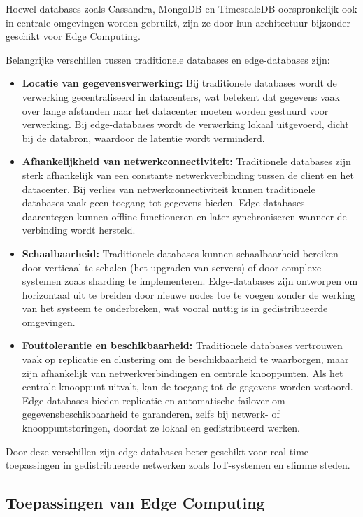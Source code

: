 Hoewel databases zoals Cassandra, MongoDB en TimescaleDB oorspronkelijk ook in centrale omgevingen worden gebruikt, zijn ze door hun architectuur bijzonder geschikt voor Edge Computing\autocite{Rahmani2018}.

Belangrijke verschillen tussen traditionele databases en edge-databases zijn:

\begin{itemize}
    \item \textbf{Locatie van gegevensverwerking:} Bij traditionele databases wordt de verwerking gecentraliseerd in datacenters, wat betekent dat gegevens vaak over lange afstanden naar het datacenter moeten worden gestuurd voor verwerking. Bij edge-databases wordt de verwerking lokaal uitgevoerd, dicht bij de databron, waardoor de latentie wordt verminderd.
    \item \textbf{Afhankelijkheid van netwerkconnectiviteit:} Traditionele databases zijn sterk afhankelijk van een constante netwerkverbinding tussen de client en het datacenter. Bij verlies van netwerkconnectiviteit kunnen traditionele databases vaak geen toegang tot gegevens bieden. Edge-databases daarentegen kunnen offline functioneren en later synchroniseren wanneer de verbinding wordt hersteld.
    \item \textbf{Schaalbaarheid:} Traditionele databases kunnen schaalbaarheid bereiken door verticaal te schalen (het upgraden van servers) of door complexe systemen zoals sharding te implementeren. Edge-databases zijn ontworpen om horizontaal uit te breiden door nieuwe nodes toe te voegen zonder de werking van het systeem te onderbreken, wat vooral nuttig is in gedistribueerde omgevingen.
    \item \textbf{Fouttolerantie en beschikbaarheid:} Traditionele databases vertrouwen vaak op replicatie en clustering om de beschikbaarheid te waarborgen, maar zijn afhankelijk van netwerkverbindingen en centrale knooppunten. Als het centrale knooppunt uitvalt, kan de toegang tot de gegevens worden vestoord. Edge-databases bieden replicatie en automatische failover om gegevensbeschikbaarheid te garanderen, zelfs bij netwerk- of knooppuntstoringen, doordat ze lokaal en gedistribueerd werken.
\end{itemize}

Door deze verschillen zijn edge-databases beter geschikt voor real-time toepassingen in gedistribueerde netwerken zoals IoT-systemen en slimme steden.
\subsection{Toepassingen van Edge Computing}

